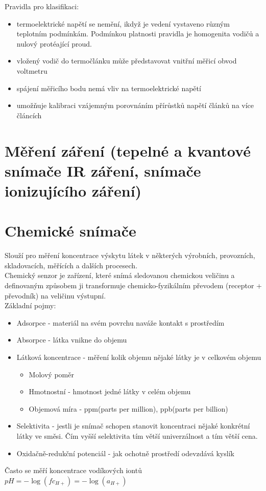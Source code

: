 Pravidla pro klasifikaci:
\begin{itemize}
    \item termoelektrické napětí se nemění, ikdyž je vedení vystaveno různým teplotním podmínkám. Podmínkou platnosti pravidla je homogenita vodičů a nulový protéající proud. 
    \item vložený vodič do termočlánku může představovat vnitřní měřicí obvod voltmetru 
    \item spájení měřicího bodu nemá vliv na termoelektrické napětí 
    \item umožňuje kalibraci vzájemným porovnáním přírůstků napětí článků na více článcích
\end{itemize}

\section{Měření záření (tepelné a kvantové snímače IR záření, snímače ionizujícího záření)}


\section{Chemické snímače}
Slouží pro měření koncentrace výskytu látek v některých výrobních, provozních, skladovacích, měřících a dalších procesech.\\
Chemický senzor je zařízení, které snímá sledovanou chemickou veličinu a definovaným způsobem ji transformuje chemicko-fyzikálním převodem (receptor + převodník) na veličinu výstupní.\\
Základní pojmy:
\begin{itemize}
    \item Adsorpce - materiál na svém povrchu naváže kontakt s prostředím
    \item Absorpce - látka vnikne do objemu
    \item Látková koncentrace - měření kolik objemu nějaké látky je v celkovém objemu
          \begin{itemize}
              \item Molový poměr
              \item Hmotnostní - hmotnost jedné látky v celém objemu
              \item Objemová míra - ppm(parts per million), ppb(parts per billion)
          \end{itemize}
    \item Selektivita - jestli je snímač schopen stanovit koncentraci nějaké konkrétní látky ve směsi. Čím vyšší selektivita tím větší univerzálnost a tím větší cena.
    \item Oxidačně-redukční potenciál - jak ochotně prostředí odevzdává kyslík
\end{itemize}
Často se měří koncentrace vodíkových iontů \(pH = -\log(fc_{H+}) = -\log(a_{H+})\)\\

